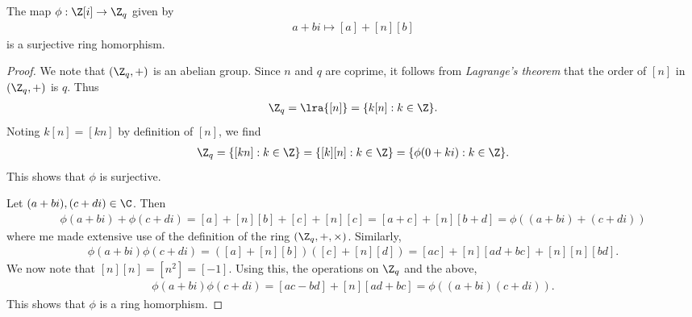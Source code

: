 \documentclass{article}
\begin{document}
\begin{claim*}[3]
	The map $\phi:\gaussint\to\Z_{q}$ given by
	\begin{align*}
		a + bi \mapsto [a]+[n][b]
	\end{align*}
	is a surjective ring homorphism.
	\begin{proof}
		We note that $(\Z_q,+)$ is an abelian group. Since $n$ and $q$ are coprime, it follows from
		\emph{Lagrange's theorem} that the order of $[n]$ in $(\Z_q,+)$ is $q$. Thus
		\begin{align*}
			\Z_q = \lra{[n]} = \{k[n] : k\in\Z\}.
		\end{align*}
		Noting $k[n]=[kn]$ by definition of $[n]$, we find
		\begin{align*}
			\Z_q = \{[kn] : k\in\Z\} = \{[k][n] : k\in\Z\} = \{\phi(0+ki):k\in\Z\}.
		\end{align*}
		This shows that $\phi$ is surjective.

		Let $(a+bi),(c+di)\in\C$. Then
		\begin{align*}
			\phi(a+bi) + \phi(c+di) = [a] + [n][b] + [c] + [n][c] = [a+c] + [n][b+d] = \phi((a+bi) + (c+di))
		\end{align*}
		where me made extensive use of the definition of the ring $(\Z_q,+,\times)$.
		Similarly,
		\begin{align*}
			\phi(a+bi)\phi(c+di)=([a]+[n][b])([c]+[n][d])=[ac]+[n][ad+bc]+[n][n][bd].
		\end{align*}
		We now note that $[n][n]=[n^2]=[-1]$. Using this, the operations on $\Z_q$ and the above,
		\begin{align*}
			\phi(a+bi)\phi(c+di)=[ac-bd]+[n][ad+bc]=\phi((a+bi)(c+di)).
		\end{align*}
		This shows that $\phi$ is a ring homorphism.
	\end{proof}
\end{claim*}
\end{document}
